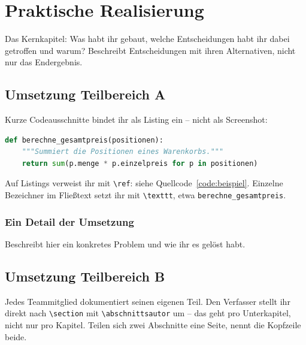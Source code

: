 \chapter{Praktische Realisierung}

Das Kernkapitel: Was habt ihr gebaut, welche Entscheidungen habt ihr dabei
getroffen und warum? Beschreibt Entscheidungen mit ihren Alternativen, nicht
nur das Endergebnis.

\section{Umsetzung Teilbereich A}

Kurze Codeausschnitte bindet ihr als Listing ein -- nicht als Screenshot:

\begin{lstlisting}[language=Python, caption={Beispiel für ein Quellcode-Listing}, label=code:beispiel]
def berechne_gesamtpreis(positionen):
    """Summiert die Positionen eines Warenkorbs."""
    return sum(p.menge * p.einzelpreis for p in positionen)
\end{lstlisting}

Auf Listings verweist ihr mit \verb|\ref|: siehe Quellcode~\ref{code:beispiel}.
Einzelne Bezeichner im Fließtext setzt ihr mit \verb|\texttt|, etwa
\texttt{berechne\_gesamtpreis}.

\subsection{Ein Detail der Umsetzung}

Beschreibt hier ein konkretes Problem und wie ihr es gelöst habt.

\section{Umsetzung Teilbereich B}

Jedes Teammitglied dokumentiert seinen eigenen Teil. Den Verfasser stellt ihr
direkt nach \verb|\section| mit \verb|\abschnittsautor| um -- das geht pro
Unterkapitel, nicht nur pro Kapitel. Teilen sich zwei Abschnitte eine Seite,
nennt die Kopfzeile beide.



